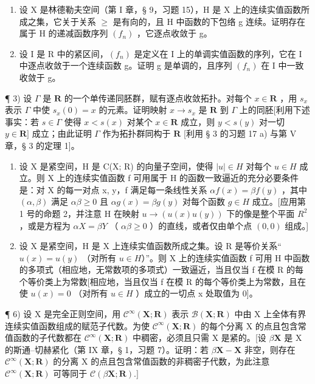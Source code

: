 \ExerciseSection

\begin{enumerate}
\def\labelenumi{\arabic{enumi})}
\item
  设 X 是林德勒夫空间（第 I 章，§ 9，习题 15），H 是 X 上的连续实值函数所成之集，它关于关系 \(\geqslant\) 是有向的，且 H 中函数的下包络 g 连续。证明存在属于 H 的递减函数序列 \((f_{n})\) ，它逐点收敛于 g。
\item
  设 I 是 R 中的紧区间，\((f_{n})\) 是定义在 I 上的单调实值函数的序列，它在 I 中逐点收敛于一个连续函数 g。证明 g 是单调的，且序列 \((f_{n})\) 在 I 中一致收敛于 g。
\end{enumerate}

¶ 3) 设 \(\Gamma\) 是 \(\mathbf{R}\) 的一个单传递同胚群，赋有逐点收敛拓扑。对每个 \(x \in \mathbf{R}\) ，用 \(s_x\) 表示 \(\Gamma\) 中使 \(s_x(0) = x\) 的元素。证明映射 \(x \to s_x\) 是 \(\mathbf{R}\) 到 \(\Gamma\) 上的同胚{[}利用下述事实：若 \(s \in \Gamma\) 使得 \(x < s(x)\) 对某个 \(x \in \mathbf{R}\) 成立，则 \(y < s(y)\) 对一切 \(y \in \mathbf{R}]\) 成立；由此证明 \(\Gamma\) 作为拓扑群同构于 \(\mathbf{R}\) {[}利用 § 3 的习题 17 a) 与第 V 章，§ 3 的定理 1{]}。

\begin{enumerate}
\def\labelenumi{\arabic{enumi})}
\setcounter{enumi}{3}
\item
  设 X 是紧空间，H 是 C(X; R) 的向量子空间，使得 \(|u| \in H\) 对每个 \(u \in H\) 成立。则 X 上的连续实值函数 f 可用属于 H 的函数一致逼近的充分必要条件是：对 X 的每一对点 x, y，f 满足每一条线性关系 \(\alpha f(x) = \beta f(y)\) ，其中 \((\alpha, \beta)\) 满足 \(\alpha\beta \geqslant 0\) 且 \(\alpha g(x) = \beta g(y)\) 对每个函数 \(g \in H\) 成立。{[}应用第 1 号的命题 2，并注意 H 在映射 \(u \to (u(x) u(y))\) 下的像是整个平面 \(R^{2}\) ，或是方程为 \(\alpha X = \beta Y\) （ \(\alpha\beta \geqslant 0\) ）的直线，或者仅由单个点 \((0, 0)\) 组成。{]}
\item
  设 X 是紧空间，H 是 X 上连续实值函数所成之集。设 R 是等价关系`` \(u(x) = u(y)\) （对所有 \(u \in H\)）''。则 X 上的连续实值函数 f 可用 H 中函数的多项式（相应地，无常数项的多项式）一致逼近，当且仅当 f 在模 R 的每个等价类上为常数{[}相应地，当且仅当 f 在模 R 的每个等价类上为常数，且在使 \(u(x) = 0\) （对所有 \(u \in H\) ）成立的一切点 x 处取值为 0{]}。
\end{enumerate}

¶ 6) 设 X 是完全正则空间，用 \(\mathcal{C}^{\infty}(\mathbf{X};\mathbf{R})\) 表示 \(\mathcal{B}(\mathbf{X};\mathbf{R})\) 中由 X 上全体有界连续实值函数组成的赋范子代数。为使 \(\mathcal{C}^{\infty}(\mathbf{X};\mathbf{R})\) 的每个分离 X 的点且包含常值函数的子代数都在 \(\mathcal{C}^{\infty}(\mathbf{X};\mathbf{R})\) 中稠密，必须且只需 X 是紧的。{[}设 \(\beta\mathbf{X}\) 是 X 的斯通–切赫紧化（第 IX 章，§ 1，习题 7）。证明：若 \(\beta\mathbf{X}-\mathbf{X}\) 非空，则存在 \(\mathcal{C}^{\infty}(\mathbf{X};\mathbf{R})\) 的分离 X 的点且包含常值函数的非稠密子代数，为此注意 \(\mathcal{C}^{\infty}(\mathbf{X};\mathbf{R})\) 可等同于 \(\mathcal{C}(\beta\mathbf{X};\mathbf{R}).]\)

